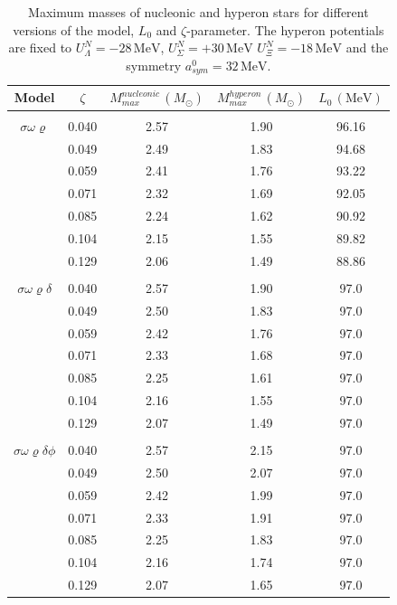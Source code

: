 \documentclass[twocolumn,showpacs,aps]{revtex4}
\begin{document}
\begin{table}[t]
  \caption{\label{table:Table_modelmass} Maximum masses of nucleonic and hyperon stars for different versions of the model, $L_0$ and $\zeta$-parameter. The hyperon potentials are fixed to $U_{\Lambda}^N=-28 \,\mathrm{MeV}$, $U_{\Sigma}^N=+30\,\mathrm{MeV}$
   $U_{\Xi}^N=-18 \,\mathrm{MeV}$ and the symmetry $a_{sym}^0=32\,\mathrm{MeV} $.}
\begin{ruledtabular}
\begin{tabular}{ccccc}
Model & $\zeta$ & $M^{nucleonic}_{max}\,(M_{\odot})$ &  $M^{hyperon}_{max}\,(M_{\odot})$ & $L_0\,(\mathrm{MeV})$  \\
  \hline
    & &  & & \\
$\sigma\omega\varrho$ &   0.040 & 2.57 & 1.90 & 96.16  \\ 
                      &   0.049 & 2.49 & 1.83  & 94.68  \\    
                      &   0.059 & 2.41 & 1.76  & 93.22  \\
                      &   0.071 & 2.32 & 1.69  & 92.05  \\ 
                      &   0.085 & 2.24 & 1.62  & 90.92  \\ 
                      &   0.104 & 2.15 & 1.55  & 89.82  \\ 
                      &   0.129 & 2.06 & 1.49  & 88.86  \\ 
  
  \hline
      & &  & &  \\
$\sigma\omega\varrho\delta$ &   0.040 & 2.57 & 1.90  & 97.0  \\ 
                            &   0.049 & 2.50 & 1.83  & 97.0  \\ 
                            &   0.059 & 2.42 & 1.76  & 97.0  \\ 
                            &   0.071 & 2.33 & 1.68  & 97.0  \\  
                            &   0.085 & 2.25 & 1.61  & 97.0  \\  
                            &   0.104 & 2.16 & 1.55  & 97.0  \\ 
                            &   0.129 & 2.07 & 1.49  & 97.0  \\  
  
  \hline
      & &  &  &  \\
$\sigma\omega\varrho\delta\phi$ &   0.040 & 2.57 & 2.15  & 97.0  \\ 
                                &   0.049 & 2.50 & 2.07  & 97.0  \\     
                                &   0.059 & 2.42 & 1.99  & 97.0  \\                        
                                &   0.071 & 2.33 & 1.91  & 97.0  \\                         
                                &   0.085 & 2.25 & 1.83  & 97.0  \\  
                                &   0.104 & 2.16 & 1.74  & 97.0  \\                         
                                &   0.129 & 2.07 & 1.65  & 97.0  \\  


\end{tabular}
\end{ruledtabular}
\end{table}
\end{document}
